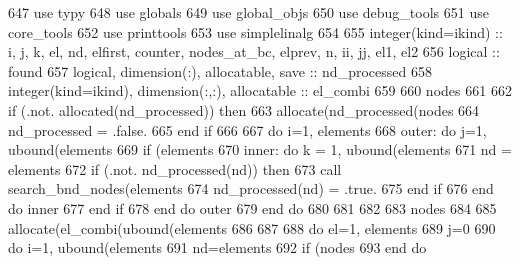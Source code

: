 \begin{DoxyCode}
647         \textcolor{keywordtype}{use }typy
648         \textcolor{keywordtype}{use }globals
649         \textcolor{keywordtype}{use }global_objs
650         \textcolor{keywordtype}{use }debug_tools
651         \textcolor{keywordtype}{use }core_tools
652         \textcolor{keywordtype}{use }printtools
653         \textcolor{keywordtype}{use }simplelinalg
654         
655         \textcolor{keywordtype}{integer(kind=ikind)} :: i, j, k, el, nd, elfirst, counter, nodes\_at\_bc, elprev, n, ii, jj, el1, el2
656         \textcolor{keywordtype}{logical} :: found
657         \textcolor{keywordtype}{logical}, \textcolor{keywordtype}{dimension(:)}, \textcolor{keywordtype}{allocatable}, \textcolor{keywordtype}{save} :: nd\_processed
658         \textcolor{keywordtype}{integer(kind=ikind)}, \textcolor{keywordtype}{dimension(:,:)}, \textcolor{keywordtype}{allocatable} :: el\_combi
659 
660         nodes%
661         
662         \textcolor{keywordflow}{if} (.not. \textcolor{keyword}{allocated}(nd\_processed)) \textcolor{keywordflow}{then}
663           \textcolor{keyword}{allocate}(nd\_processed(nodes%
664           nd\_processed = .false.
665 \textcolor{keywordflow}{        end if}
666 
667         \textcolor{keywordflow}{do} i=1, elements%
668           outer: \textcolor{keywordflow}{do} j=1, ubound(elements%
669             \textcolor{keywordflow}{if} (elements%
670               inner: \textcolor{keywordflow}{do} k = 1, ubound(elements%
671                 nd = elements%
672                 \textcolor{keywordflow}{if} (.not. nd\_processed(nd)) \textcolor{keywordflow}{then}
673                   \textcolor{keyword}{call }search_bnd_nodes(elements%
674                   nd\_processed(nd) = .true.
675 \textcolor{keywordflow}{                end if}
676 \textcolor{keywordflow}{              end do} inner
677 \textcolor{keywordflow}{            end if}
678 \textcolor{keywordflow}{          end do} outer   
679 \textcolor{keywordflow}{        end do}  
680         
681 
682         
683         nodes%
684         
685         \textcolor{keyword}{allocate}(el\_combi(ubound(elements%
686         
687 
688         \textcolor{keywordflow}{do} el=1, elements%
689           j=0
690           \textcolor{keywordflow}{do} i=1, ubound(elements%
691             nd=elements%
692             \textcolor{keywordflow}{if} (nodes%
693 \textcolor{keywordflow}{          end do}

\end{DoxyCode}
